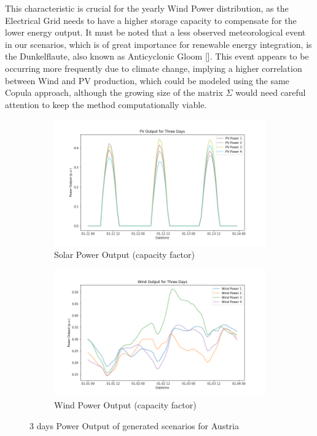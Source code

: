 \documentclass[english]{article}
\numberwithin{definition}{section}
\numberwithin{theorem}{section}
\numberwithin{problem}{section}
\begin{document}
This characteristic is crucial for the yearly Wind Power distribution, as the Electrical Grid needs to have a higher storage capacity to compensate for the lower energy output. It must be noted that a less observed meteorological event in our scenarios, which is of great importance for renewable energy integration, is the Dunkelflaute, also known as Anticyclonic Gloom [\cite{Dunkelflaut}]. This event appears to be occurring more frequently due to climate change, implying a higher correlation between Wind and PV production, which could be modeled using the same Copula approach, although the growing size of the matrix \(\Sigma\) would need careful attention to keep the method computationally viable.

\begin{figure}[H]
\centering
\begin{subfigure}{.5\textwidth}
  \centering
  \includegraphics[width=\linewidth]{immagini/scenarios/PV_power_output_3days.png}
  \caption{Solar Power Output (capacity factor)}
  \label{fig:PV few days}
\end{subfigure}%
\begin{subfigure}{.5\textwidth}
  \centering
  \includegraphics[width=\linewidth]{immagini/scenarios/wind_power_output_3days.png}
  \caption{Wind Power Output (capacity factor)}
  \label{fig:wind few days}
\end{subfigure}
\caption{3 days Power Output of generated scenarios for Austria}
\label{fig: few days power ouput}
\end{figure}
\end{document}
